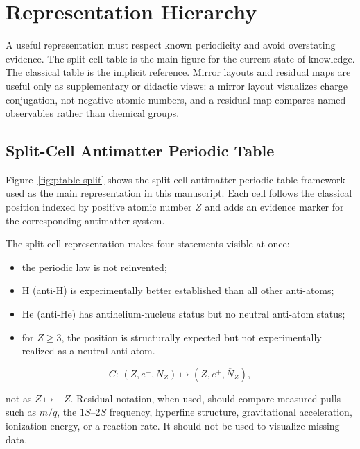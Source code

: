 \documentclass[11pt,a4paper]{article}
\newcommand{\antiH}{\ensuremath{\overline{\mathrm{H}}}}
\newcommand{\antiHe}{\ensuremath{\overline{\mathrm{He}}}}
\begin{document}
\section{Representation Hierarchy}
\label{sec:representations}

A useful representation must respect known periodicity and avoid overstating evidence. The split-cell table is the main figure for the current state of knowledge. The classical table is the implicit reference. Mirror layouts and residual maps are useful only as supplementary or didactic views: a mirror layout visualizes charge conjugation, not negative atomic numbers, and a residual map compares named observables rather than chemical groups.

\subsection{Split-Cell Antimatter Periodic Table}

Figure~\ref{fig:ptable-split} shows the split-cell antimatter periodic-table
framework used as the main representation in this manuscript. Each cell follows
the classical position indexed by positive atomic number $Z$ and adds an
evidence marker for the corresponding antimatter system.

The split-cell representation makes four statements visible at once:

\begin{itemize}
  \item the periodic law is not reinvented;
  \item \antiH{} (anti-H) is experimentally better established than all other anti-atoms;
  \item \antiHe{} (anti-He) has antihelium-nucleus status but no neutral anti-atom status;
  \item for $Z\geq3$, the position is structurally expected but not experimentally realized as a neutral anti-atom.
\end{itemize}

\begin{equation}
C:\,(Z,e^-,N_Z)\mapsto (Z,e^+,\overline{N}_Z),
\end{equation}

not as $Z\mapsto -Z$. Residual notation, when used, should compare measured pulls such as $m/q$, the $1S$--$2S$ frequency, hyperfine structure, gravitational acceleration, ionization energy, or a reaction rate. It should not be used to visualize missing data.
\end{document}
